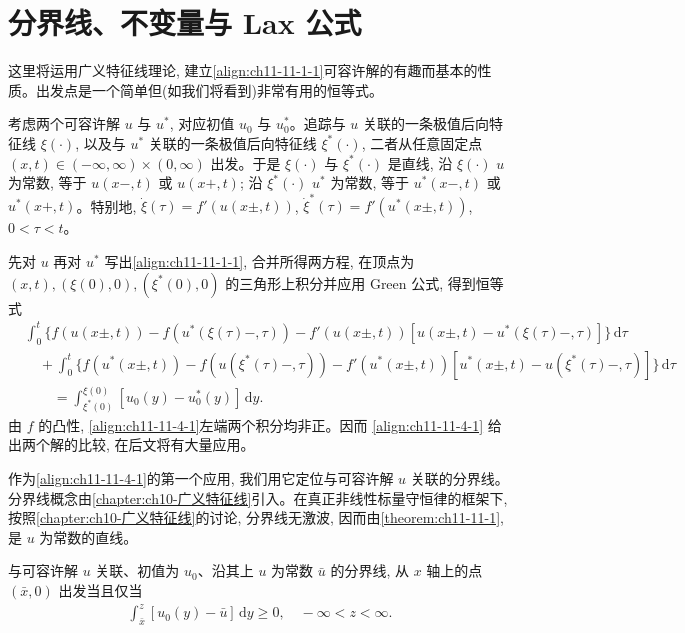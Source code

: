\documentclass[../../main.tex]{subfiles}
\begin{document}
\section{分界线、不变量与 Lax 公式}\label{section:ch11-分界线不变量与Lax公式}

这里将运用广义特征线理论, 建立\eqref{align:ch11-11-1-1}可容许解的有趣而基本的性质。出发点是一个简单但(如我们将看到)非常有用的恒等式。

考虑两个可容许解 $u$ 与 $u^*$, 对应初值 $u_0$ 与 $u_0^*$。追踪与 $u$ 关联的一条极值后向特征线 $\xi(\cdot)$, 以及与 $u^*$ 关联的一条极值后向特征线 $\xi^*(\cdot)$, 二者从任意固定点 $(x,t)\in(-\infty,\infty)\times(0,\infty)$ 出发。于是 $\xi(\cdot)$ 与 $\xi^*(\cdot)$ 是直线, 沿 $\xi(\cdot)$ $u$ 为常数, 等于 $u(x-,t)$ 或 $u(x+,t)$; 沿 $\xi^*(\cdot)$ $u^*$ 为常数, 等于 $u^*(x-,t)$ 或 $u^*(x+,t)$。特别地, $\dot{\xi}(\tau)=f'(u(x\pm,t))$, $\dot{\xi}^*(\tau)=f'(u^*(x\pm,t))$, $0<\tau<t$。

先对 $u$ 再对 $u^*$ 写出\eqref{align:ch11-11-1-1}, 合并所得两方程, 在顶点为 $(x,t),(\xi(0),0),(\xi^*(0),0)$ 的三角形上积分并应用 Green 公式, 得到恒等式
\begin{align}
&\int_0^t\bigl\{f(u(x\pm,t))-f(u^*(\xi(\tau)-,\tau))-f'(u(x\pm,t))[u(x\pm,t)-u^*(\xi(\tau)-,\tau)]\bigr\}\,\mathrm{d}\tau\nonumber\\
&\quad+\int_0^t\bigl\{f(u^*(x\pm,t))-f(u(\xi^*(\tau)-,\tau))-f'(u^*(x\pm,t))[u^*(x\pm,t)-u(\xi^*(\tau)-,\tau)]\bigr\}\,\mathrm{d}\tau\nonumber\\
&\qquad=\int_{\xi^*(0)}^{\xi(0)}[u_0(y)-u_0^*(y)]\,\mathrm{d}y.\label{align:ch11-11-4-1}
\end{align}
由 $f$ 的凸性, \eqref{align:ch11-11-4-1}左端两个积分均非正。因而 \eqref{align:ch11-11-4-1} 给出两个解的比较, 在后文将有大量应用。

作为\eqref{align:ch11-11-4-1}的第一个应用, 我们用它定位与可容许解 $u$ 关联的分界线。分界线概念由\cref{chapter:ch10-广义特征线}引入。在真正非线性标量守恒律的框架下, 按照\cref{chapter:ch10-广义特征线}的讨论, 分界线无激波, 因而由\cref{theorem:ch11-11-1}, 是 $u$ 为常数的直线。


\begin{theorem}\label{theorem:ch11-11-4-1}
与可容许解 $u$ 关联、初值为 $u_0$、沿其上 $u$ 为常数 $\bar u$ 的分界线, 从 $x$ 轴上的点 $(\bar x,0)$ 出发当且仅当
\begin{align}
\int_{\bar x}^{z}[u_0(y)-\bar u]\,\mathrm{d}y\geqslant0,\quad -\infty<z<\infty.\label{align:ch11-11-4-2}
\end{align}
\end{theorem}
\end{document}
